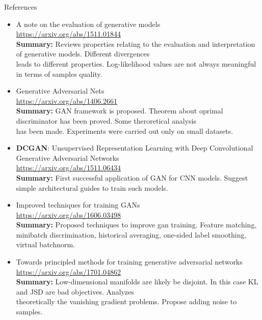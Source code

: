\documentclass{beamer}
\begin{document}
\begin{frame}{References}
{\tiny
\begin{itemize}
	\item A note on the evaluation of generative models \\
	\href{https://arxiv.org/abs/1511.01844}{https://arxiv.org/abs/1511.01844} \\
	\textbf{Summary:} Reviews properties relating to the evaluation and interpretation of generative models. Different divergences \\ leads to different properties. Log-likelihood values are not always meaningful in terms of samples quality.
	
	\item Generative Adversarial Nets \\
	\href{https://arxiv.org/abs/1406.2661}{https://arxiv.org/abs/1406.2661} \\
	\textbf{Summary:} GAN framework is proposed. Theorem about oprimal discriminator has been proved. Some theroretical analysis \\ has been made. Experiments were carried out only on small datasets.
	
	\item \textbf{DCGAN}: Unsupervised Representation Learning with Deep Convolutional Generative Adversarial Networks \\
	\href{https://arxiv.org/abs/1511.06434}{https://arxiv.org/abs/1511.06434} \\
	\textbf{Summary:} First successful application of GAN for CNN models. Suggest simple architectural guides to train such models. 
	
	\item Improved techniques for training GANs \\
	\href{https://arxiv.org/abs/1606.03498}{https://arxiv.org/abs/1606.03498} \\
	\textbf{Summary:} Proposed techniques to improve gan training. Feature matching, minibatch discrimination, historical averaging, one-sided label smoothing, virtual batchnorm.
	
	\item Towards principled methods for training generative adversarial networks \\
	\href{https://arxiv.org/abs/1701.04862}{https://arxiv.org/abs/1701.04862} \\
	\textbf{Summary:} Low-dimensional manifolds are likely be disjoint. In this case KL and JSD are bad objectives. Analyzes \\ theoretically the vanishing gradient problems. Propose adding noise to samples.
	

\end{itemize}}
\end{frame}
\end{document}
